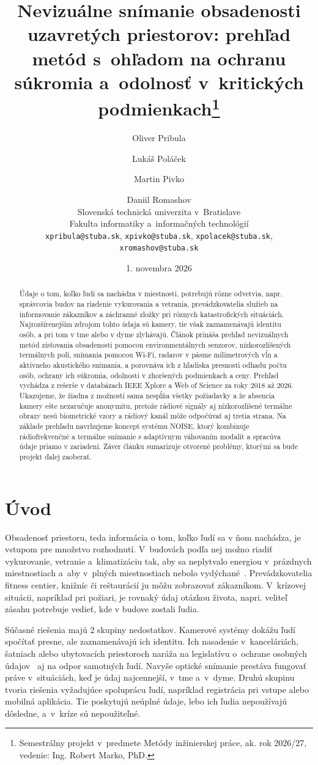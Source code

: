 \documentclass[10pt,twoside,a4paper]{article}
\title{Nevizuálne snímanie obsadenosti uzavretých priestorov: prehľad metód s~ohľadom na ochranu súkromia a~odolnosť v~kritických podmienkach\thanks{Semestrálny projekt v~predmete Metódy inžinierskej práce, ak. rok 2026/27, vedenie: {Ing. Robert Marko, PhD.}}}
\author{Oliver Pribula \and Lukáš Poláček \and Martin Pivko \and Daniil Romashov\\[6pt]
{\small Slovenská technická univerzita v~Bratislave}\\
{\small Fakulta informatiky a~informačných technológií}\\
{\small \texttt{{xpribula}@stuba.sk}, \small \texttt{{xpivko}@stuba.sk}},  \small \texttt{{xpolacek}@stuba.sk},  \small \texttt{{xromashov}@stuba.sk}}
\date{\small 1. novembra 2026}
\begin{document}
\maketitle

\begin{abstract}
Údaje o tom, koľko ľudí sa nachádza v miestnosti, potrebujú rôzne odvetvia, napr. správcovia budov na riadenie vykurovania a vetrania, prevádzkovatelia služieb na informovanie zákazníkov a záchranné zložky pri rôznych katastrofických situáciách. Najrozšírenejším zdrojom tohto údaja sú kamery, tie však zaznamenávajú identitu osôb, a pri tom v tme alebo v dyme zlyhávajú. Článok prináša prehľad nevizuálnych metód zisťovania obsadenosti  pomocou environmentálnych senzorov, nízkorozlíšených termálnych polí, snímania pomocou Wi-Fi, radarov v pásme milimetrových vĺn a aktívneho akustického snímania, a porovnáva ich z hľadiska presnosti odhadu počtu osôb, ochrany ich súkromia, odolnosti v zhoršených podmienkach a ceny. Prehľad vychádza z rešerše v databázach IEEE Xplore a Web of Science za roky 2018 až 2026. Ukazujeme, že žiadna z možností sama nespĺňa všetky požiadavky a že absencia kamery ešte nezaručuje anonymitu, pretože rádiové signály aj nízkorozlíšené termálne obrazy nesú biometrické vzory a rádiový kanál môže odpočúvať aj tretia strana. Na základe prehľadu navrhujeme koncept systému NOISE, ktorý kombinuje rádiofrekvenčné a termálne snímanie s adaptívnym váhovaním modalít a spracúva údaje priamo v zariadení. Záver článku sumarizuje otvorené problémy, ktorými sa bude projekt ďalej zaoberať.
\end{abstract}

\section{Úvod}\label{uvod}

Obsadenosť priestoru, teda informácia o tom, koľko ľudí sa v ňom nachádza, je vstupom pre množstvo rozhodnutí. V~budovách podľa nej možno riadiť vykurovanie, vetranie a~klimatizáciu tak, aby sa neplytvalo energiou v~prázdnych miestnostiach a~aby v~plných miestnostiach nebolo vydýchané~\cite{amiri2025review}. Prevádzkovatelia fitness centier, knižníc či reštaurácií ju môžu zobrazovať zákazníkom. V~krízovej situácii, napríklad pri požiari, je rovnaký údaj otázkou života, napri. veliteľ zásahu potrebuje vedieť, kde v budove zostali ľudia.

Súčasné riešenia majú 2 skupiny nedostatkov. Kamerové systémy dokážu ľudí spočítať presne, ale zaznamenávajú ich identitu. Ich nasadenie v~kanceláriách, šatniach alebo ubytovacích priestoroch naráža na legislatívu o~ochrane osobných údajov~\cite{gdpr2016} aj na odpor samotných ľudí. Navyše optické snímanie prestáva fungovať práve v~situáciách, keď je údaj najcennejší, v~tme a~v~dyme. Druhú skupinu tvoria riešenia vyžadujúce spoluprácu ľudí, napríklad registrácia pri vstupe alebo mobilná aplikácia. Tie poskytujú neúplné údaje, lebo ich ľudia nepoužívajú dôsledne, a~v~kríze sú nepoužiteľné.
\end{document}
